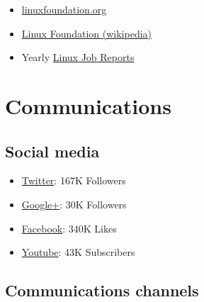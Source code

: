 \begin{itemize}
\itemsep1pt\parskip0pt
\item
  \href{http://linuxfoundation.org}{linuxfoundation.org}
\item
  \href{http://en.wikipedia.org/wiki/Linux_Foundation}{Linux Foundation
  (wikipedia)}
\item
  Yearly
  \href{http://www.linuxfoundation.org/publications/linux-foundation}{Linux
  Job Reports}
\end{itemize}

\section{Communications}\label{communications}

\subsection{Social media}\label{social-media}

\begin{itemize}
\itemsep1pt\parskip0pt
\item
  \href{https://twitter.com/linuxfoundation}{Twitter}: 167K Followers
\item
  \href{https://plus.google.com/+LinuxfoundationOrg/posts}{Google+}: 30K
  Followers
\item
  \href{https://www.facebook.com/TheLinuxFoundation}{Facebook}: 340K
  Likes
\item
  \href{https://www.youtube.com/user/TheLinuxFoundation}{Youtube}: 43K
  Subscribers
\end{itemize}

\subsection{Communications channels}\label{communications-channels}

